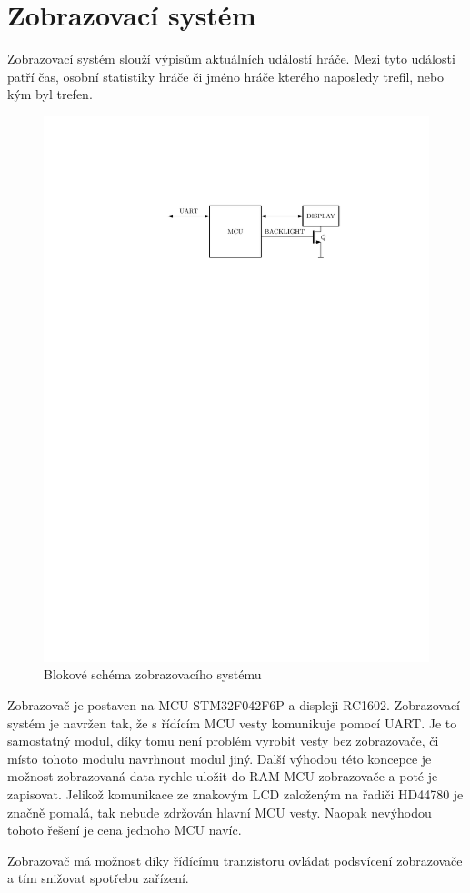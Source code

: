 \chapter{Zobrazovací systém}

Zobrazovací systém slouží výpisům aktuálních událostí hráče. Mezi tyto události patří čas, osobní statistiky hráče či jméno hráče kterého naposledy trefil, nebo kým byl trefen.

\begin{figure}[H]
    \begin{center}
        \includegraphics[width=\textwidth]{img/display}
    \end{center}
    \caption{Blokové schéma zobrazovacího systému}
\end{figure}

Zobrazovač je postaven na MCU STM32F042F6P a displeji RC1602. Zobrazovací systém je navržen tak, že s řídícím MCU vesty komunikuje pomocí UART. Je to samostatný modul, díky tomu není problém vyrobit vesty bez zobrazovače, či místo tohoto modulu navrhnout modul jiný. Další výhodou této koncepce je možnost zobrazovaná data rychle uložit do RAM MCU zobrazovače a poté je zapisovat. Jelikož komunikace ze znakovým LCD založeným na řadiči HD44780 je značně pomalá, tak nebude zdržován hlavní MCU vesty. Naopak nevýhodou tohoto řešení je cena jednoho MCU navíc.

Zobrazovač má možnost díky řídícímu tranzistoru ovládat podsvícení zobrazovače a tím snižovat spotřebu zařízení.
